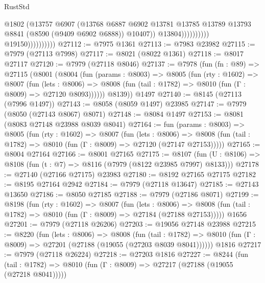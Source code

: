 \begin{lexlean}{RustStd}
\begin{coremodule}
                                            @1802
                                            (@13757
                                              @6907
                                              (@13768
                                                @6887
                                                @6902
                                                @13781
                                                @13785
                                                @13789
                                                @13793
                                                @8841
                                                (@8590 (@9409 @6902 @6888))
                                                @10407))
                                            @13804))))))))))
                        @19150))))))))))
@27112 := @7975 @1361
@27113 := @7983 @23982
@27115 := @7979 (@27113 @7998)
@27117 := @8021 (@8022 @1361)
@27118 := @8017 @27117
@27120 := @7979 (@27118 @8046)
@27137 := @7978
    (fun (fn : @89) =>
    @27115
      (@8001
        (@8004
          (fun (params : @8003) =>
          @8005
            (fun (rty : @1602) =>
            @8007
              (fun (lets : @8006) =>
              @8008 (fun (tail : @1782) => @8010 (fun (Γ : @8009) => @27120 @8093))))))
        @8139))
    @1497
@27140 := @8145 (@27113 (@7996 @1497))
@27143 := @8058 (@8059 @1497) @23985
@27147 := @7979 (@8050 (@27143 @8067) @8071)
@27148 := @8084 @1497
@27153 := @8081 (@8083 @27148 @23988 @8039 @8041)
@27164 := fun (params : @8003) =>
  @8005
    (fun (rty : @1602) =>
    @8007
      (fun (lets : @8006) =>
      @8008 (fun (tail : @1782) => @8010 (fun (Γ : @8009) => @27120 (@27147 @27153)))))
@27165 := @8004 @27164
@27166 := @8001 @27165
@27175 := @8107
    (fun (U : @8106) => @8108 (fun (t : @7) => @8116 (@7979 (@8122 @23985 @7997) @8133)))
@27178 := @27140 (@27166 @27175) @23983
@27180 := @8192 @27165 @27175
@27182 := @8195 @27164 @2942
@27184 := @7979 (@27118 @13647)
@27185 := @27143 @13650
@27186 := @8050 @27185
@27188 := @7979 (@27186 @8071)
@27199 := @8198
    (fun (rty : @1602) =>
    @8007
      (fun (lets : @8006) =>
      @8008 (fun (tail : @1782) => @8010 (fun (Γ : @8009) => @27184 (@27188 @27153)))))
    @1656
@27201 := @7979 (@27118 @26206)
@27203 := @19056 @27148 @23988
@27215 := @8220
    (fun (lets : @8006) =>
    @8008
      (fun (tail : @1782) =>
      @8010 (fun (Γ : @8009) => @27201 (@27188 (@19055 (@27203 @8039 @8041))))))
    @1816
@27217 := @7979 (@27118 @26224)
@27218 := @27203 @1816
@27227 := @8244
    (fun (tail : @1782) => @8010 (fun (Γ : @8009) => @27217 (@27188 (@19055 (@27218 @8041)))))

\end{coremodule}
\end{lexlean}
